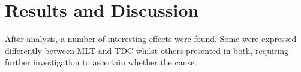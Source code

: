 \section{Results and Discussion} \label{sec:Results/Discussion}
After analysis, a number of interesting effects were found. Some were expressed differently between \gls{MLT} and \gls{TDC} whilst others presented in both, requiring further investigation to ascertain whether the cause. 



%


